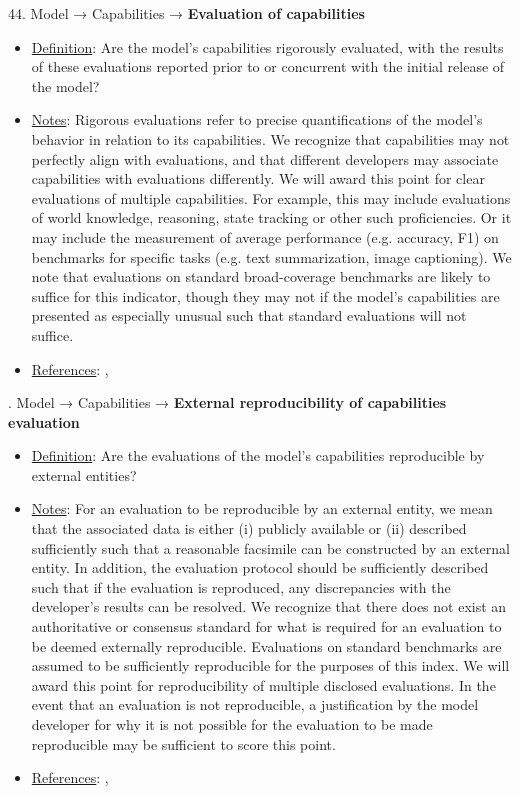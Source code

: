 44. Model → Capabilities → \textbf{Evaluation of capabilities}
\vspace{-\parskip}
\begin{itemize}
\item
\underline{Definition}: Are the model’s capabilities rigorously evaluated, with the results of these evaluations reported prior to or concurrent with the initial release of the model?
\item
\underline{Notes}: Rigorous evaluations refer to precise quantifications of the model's behavior in relation to its capabilities. We recognize that capabilities may not perfectly align with evaluations, and that different developers may associate capabilities with evaluations differently. We will award this point for clear evaluations of multiple capabilities. For example, this may include evaluations of world knowledge, reasoning, state tracking or other such proficiencies. Or it may include the measurement of average performance (e.g. accuracy, F1) on benchmarks for specific tasks (e.g. text summarization, image captioning). We note that evaluations on standard broad-coverage benchmarks are likely to suffice for this indicator, though they may not if the model's capabilities are presented as especially unusual such that standard evaluations will not suffice.
\item
\underline{References}: \citet{srivastava2022bigbench}, \citet{liang2022helm}
\end{itemize} \vspace{\baselineskip}


. Model → Capabilities → \textbf{External reproducibility of capabilities evaluation}
\vspace{-\parskip}
\begin{itemize}
\item
\underline{Definition}: Are the evaluations of the model’s capabilities reproducible by external entities?
\item
\underline{Notes}: For an evaluation to be reproducible by an external entity, we mean that the associated data is either (i) publicly available or (ii) described sufficiently such that a reasonable facsimile can be constructed by an external entity. In addition, the evaluation protocol should be sufficiently described such that if the evaluation is reproduced, any discrepancies with the developer's results can be resolved. We recognize that there does not exist an authoritative or consensus standard for what is required for an evaluation to be deemed externally reproducible. Evaluations on standard benchmarks are assumed to be sufficiently reproducible for the purposes of this index. We will award this point for reproducibility of multiple disclosed evaluations. In the event that an evaluation is not reproducible, a justification by the model developer for why it is not possible for the evaluation to be made reproducible may be sufficient to score this point.
\item
\underline{References}: \citet{kapoor2023leakage}, \citet{liang2022helm}
\end{itemize} \vspace{\baselineskip}


